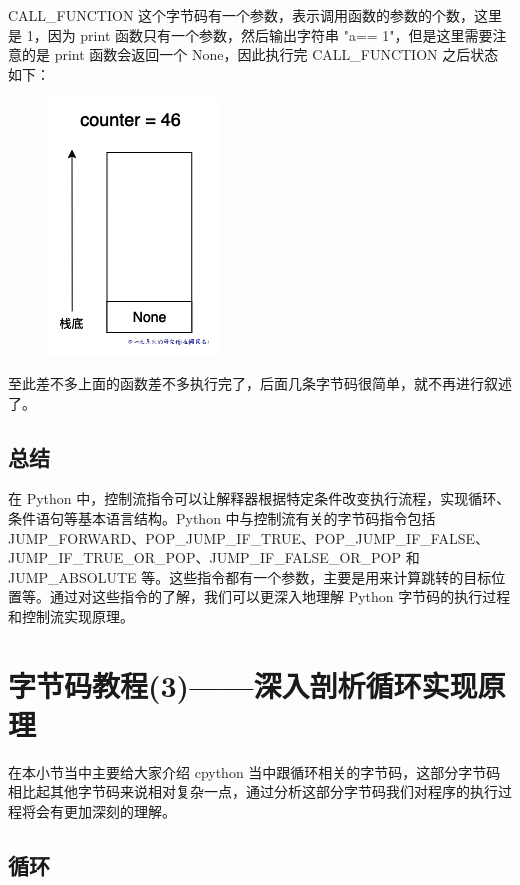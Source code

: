 CALL\_FUNCTION 这个字节码有一个参数，表示调用函数的参数的个数，这里是 1，因为 print 函数只有一个参数，然后输出字符串 "a== 1"，但是这里需要注意的是 print 函数会返回一个 None，因此执行完 CALL\_FUNCTION 之后状态如下：

    \begin{figure}[H]
        \centering
            \includegraphics[scale=.25]{images/65-bytecode.png}
						\caption{ }
        \label{fig:my_label}
    \end{figure}
    
至此差不多上面的函数差不多执行完了，后面几条字节码很简单，就不再进行叙述了。
\subsection{总结}
在 Python 中，控制流指令可以让解释器根据特定条件改变执行流程，实现循环、条件语句等基本语言结构。Python 中与控制流有关的字节码指令包括 JUMP\_FORWARD、POP\_JUMP\_IF\_TRUE、POP\_JUMP\_IF\_FALSE、JUMP\_IF\_TRUE\_OR\_POP、JUMP\_IF\_FALSE\_OR\_POP 和 JUMP\_ABSOLUTE 等。这些指令都有一个参数，主要是用来计算跳转的目标位置等。通过对这些指令的了解，我们可以更深入地理解 Python 字节码的执行过程和控制流实现原理。


\section{字节码教程(3)——深入剖析循环实现原理}
在本小节当中主要给大家介绍 cpython 当中跟循环相关的字节码，这部分字节码相比起其他字节码来说相对复杂一点，通过分析这部分字节码我们对程序的执行过程将会有更加深刻的理解。
\subsection{循环}
